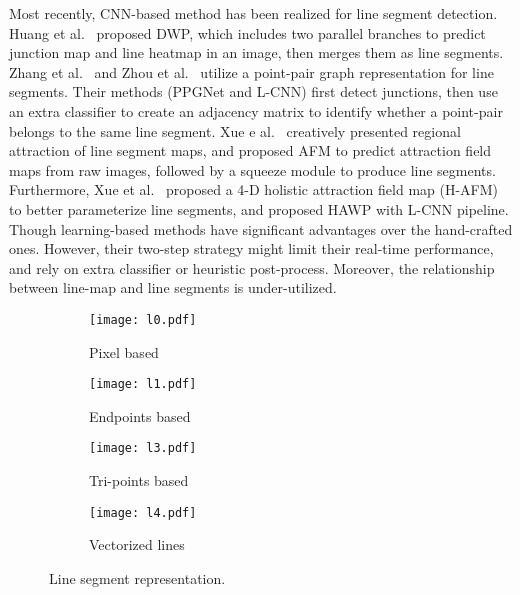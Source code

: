 \documentclass[runningheads]{llncs}
\begin{document}
Most recently, CNN-based method has been realized for line segment detection.
Huang et al.~\cite{Wireframe} proposed DWP, which includes two parallel branches to predict junction map and line heatmap in an image, then merges them as line segments. Zhang et al.~\cite{PPG} and Zhou et al.~\cite{LCNN} utilize a point-pair graph representation for line segments. Their methods (PPGNet and L-CNN) first detect junctions, then use an extra classifier to create an adjacency matrix to identify whether a point-pair belongs to the same line segment. Xue e al.~\cite{AFM} creatively presented regional attraction of line segment maps, and proposed AFM to predict attraction field maps from raw images, followed by a squeeze module to produce line segments.
Furthermore, Xue et al.~\cite{HAWP} proposed a 4-D holistic attraction field map (H-AFM) to better parameterize line segments, and proposed HAWP with L-CNN pipeline.
Though learning-based methods have significant advantages over the hand-crafted ones. However, their two-step strategy might limit their real-time performance, and rely on extra classifier or heuristic post-process. Moreover, the relationship between line-map and line segments is under-utilized.


\begin{figure}[t]
\begin{center}
     \begin{subfigure}[b]{0.24\textwidth}
         \centering
         \texttt{[image: l0.pdf]}
         \caption{Pixel based}
         \label{SLS_ega}
     \end{subfigure}
     \begin{subfigure}[b]{0.24\textwidth}
         \centering
         \texttt{[image: l1.pdf]}
         \caption{Endpoints based}
         \label{SLS_egb}
     \end{subfigure}
     \begin{subfigure}[b]{0.24\textwidth}
         \centering
         \texttt{[image: l3.pdf]}
         \caption{Tri-points based}
         \label{SLS_egc}
     \end{subfigure}
     \begin{subfigure}[b]{0.24\textwidth}
         \centering
         \texttt{[image: l4.pdf]}
         \caption{Vectorized lines}
         \label{SLS_egd}
     \end{subfigure}
   \end{center}
    \caption{Line segment representation.}
    
\end{figure}
\end{document}

